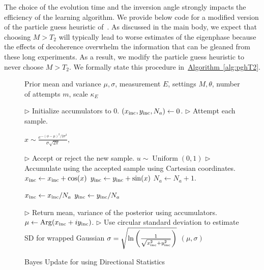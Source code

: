 \documentclass[aps,pra,amsmath,twocolumn,amssymb,superscriptaddress]{revtex4-1}
\newcommand{\linecomment}[1]{\State \(\triangleright\) {\footnotesize #1} \normalsize}
\newcommand{\CRej}{\text{RejF }}
\newcommand{\alg}[1]{\hyperref[alg:#1]{Algorithm~\ref*{alg:#1}}}
\begin{document}
The choice of the evolution time and the inversion angle strongly impacts the efficiency of the learning algorithm.  We provide below code for a modified version of the
particle guess heuristic of~\cite{wiebe_hamiltonian_2014}.  As discussed in the main body, we expect that choosing $M> T_2$ will typically lead to worse estimates of the eigenphase because the effects of decoherence overwhelm the information that can be gleaned from these long experiments.  As a result, we modify the particle guess heuristic  to never choose $M> T_2$.  We formally state this procedure in~\alg{pghT2}.


\begin{figure}[h]
\begin{algorithm}[H]
    \caption{Bayes Update for \CRej using Directional Statistics}
    \label{alg:crej2}
    \begin{algorithmic}

        \Require Prior mean and variance $\mu,\sigma$, measurement $E$,
            settings $M,\theta$, number of attempts $m$, scale $\kappa_E$

        \linecomment{Initialize accumulators to 0.}
	\State $(x_{\rm inc},y_{\rm inc},N_a) \gets 0$.
        \linecomment{Attempt each sample.}

            \State $x \sim\frac{e^{-(\phi-\mu)^2/2 \sigma^2}}{\sigma\sqrt{2 \pi }},$
          
            \linecomment{Accept or reject the new sample.}
            \State $u \sim \operatorname{Uniform}(0, 1)$
                \linecomment{Accumulate using the accepted sample using Cartesian coordinates.}
                \State $x_{\rm inc} \gets x_{\rm inc}+ \cos(x)$
                \State $y_{\rm inc} \gets y_{\rm inc}+ \sin(x)$
                \State $N_a \gets N_a +1$.
            \EndIf
        \EndFor

        \State $x_{\rm inc}\gets x_{\rm inc}/N_a $
        \State $y_{\rm inc}\gets y_{\rm inc}/N_a $

        \linecomment{Return mean, variance of the posterior using accumulators.}
	\State $\mu\gets {\rm Arg}(x_{\rm inc}+iy_{\rm inc})$.
\linecomment{Use circular standard deviation to estimate SD for wrapped Gaussian}
	\State $\sigma = \sqrt{\ln\left(\frac{1}{\sqrt{x_{\rm inc}^2 + y_{\rm inc}^2}}\right)}$
        \State\Return $(\mu,\sigma)$

    \end{algorithmic}
\end{algorithm}
\end{figure}
\end{document}
